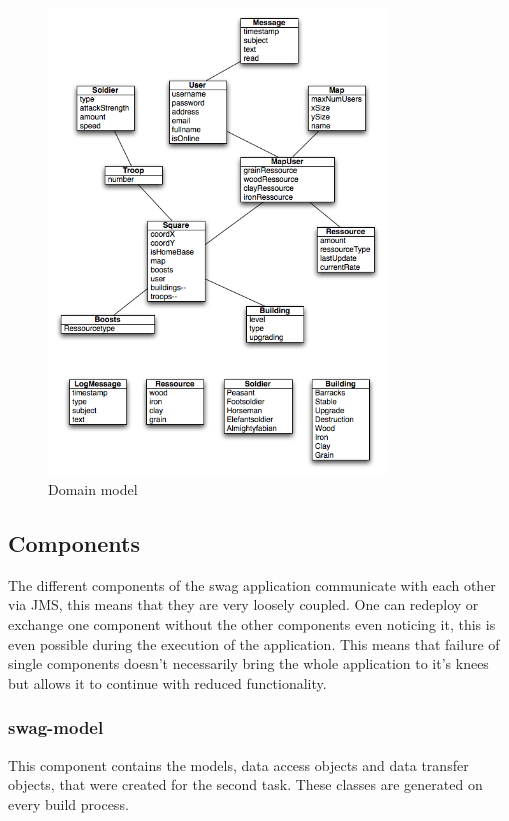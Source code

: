 \documentclass[a4paper]{article}
\begin{document}
\begin{figure}[htb]
\begin{center}
\leavevmode
\includegraphics[width=0.8\textwidth]{Domain.png}
\end{center}
\caption{Domain model}
\end{figure}



\subsection{Components}

The different components of the swag application communicate with each other via JMS, this means that they are very loosely
coupled. 
One can redeploy or exchange one component without the other components even noticing it, this is even possible during
the execution of the application.
This means that failure of single components doesn't necessarily bring the whole application to it's knees but allows
it to continue with reduced functionality.

\subsubsection{swag-model}
This component contains the models, data access objects and data transfer objects, that were created for the second task. These classes are generated on every build process. 
\end{document}

